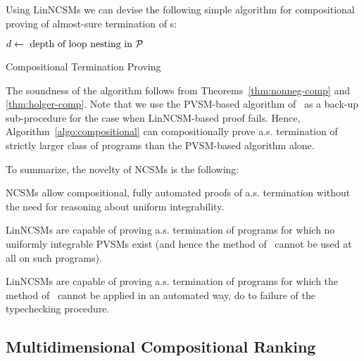 
Using LinNCSMs we can devise the following simple algorithm for compositional proving of almost-sure termination of \APP{}s:

\begin{algorithm}
\DontPrintSemicolon

$d\leftarrow \text{ depth of loop nesting in $\mathcal{P}$}$\;
\caption{Compositional Termination Proving}
\label{algo:compositional}
\end{algorithm}

The soundness of the algorithm follows from Theorems~\ref{thm:nonneg-comp} and \ref{thm:holger-comp}. Note that we use the PVSM-based algorithm of~\cite{HolgerPOPL} as a back-up sub-procedure for the case when LinNCSM-based proof fails. Hence, Algorithm~\ref{algo:compositional} can compositionally prove a.s. termination of strictly larger class of programs than the PVSM-based algorithm alone.

To summarize, the novelty of NCSMs is the following:
\begin{compactenum}
\item
NCSMs allow compositional, fully automated proofs of a.s. termination without the need for reasoning about uniform integrability.
\item LinNCSMs are capable of proving a.s. termination of programs for which no uniformly integrable PVSMs exist (and hence the method of~\cite{HolgerPOPL} cannot be used at all on such programs).
\item LinNCSMs are capable of proving a.s. termination of programs for which the method of~\cite{HolgerPOPL} cannot be applied in an automated way, do to failure of the typechecking procedure.
\end{compactenum}

\subsection{Multidimensional Compositional Ranking}


